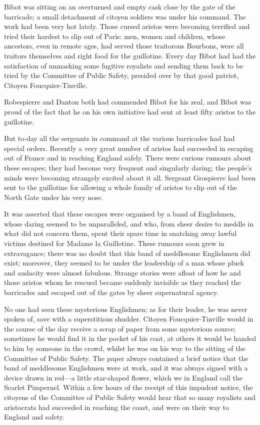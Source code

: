 Bibot was sitting on an overturned and empty cask close by the gate of the barricade; a small detachment of citoyen soldiers was under his command. The work had been very hot lately. Those cursed aristos were becoming terrified and tried their hardest to slip out of Paris: men, women and children, whose ancestors, even in remote ages, had served those traitorous Bourbons, were all traitors themselves and right food for the guillotine. Every day Bibot had had the satisfaction of unmasking some fugitive royalists and sending them back to be tried by the Committee of Public Safety, presided over by that good patriot, Citoyen Foucquier-Tinville.

Robespierre and Danton both had commended Bibot for his zeal, and Bibot was proud of the fact that he on his own initiative had sent at least fifty aristos to the guillotine.

But to-day all the sergeants in command at the various barricades had had special orders. Recently a very great number of aristos had succeeded in escaping out of France and in reaching England safely. There were curious rumours about these escapes; they had become very frequent and singularly daring; the people's minds were becoming strangely excited about it all. Sergeant Grospierre had been sent to the guillotine for allowing a whole family of aristos to slip out of the North Gate under his very nose.

It was asserted that these escapes were organised by a band of Englishmen, whose daring seemed to be unparalleled, and who, from sheer desire to meddle in what did not concern them, spent their spare time in snatching away lawful victims destined for Madame la Guillotine. These rumours soon grew in extravagance; there was no doubt that this band of meddlesome Englishmen did exist; moreover, they seemed to be under the leadership of a man whose pluck and audacity were almost fabulous. Strange stories were afloat of how he and those aristos whom he rescued became suddenly invisible as they reached the barricades and escaped out of the gates by sheer supernatural agency.

No one had seen these mysterious Englishmen; as for their leader, he was never spoken of, save with a superstitious shudder. Citoyen Foucquier-Tinville would in the course of the day receive a scrap of paper from some mysterious source; sometimes he would find it in the pocket of his coat, at others it would be handed to him by someone in the crowd, whilst he was on his way to the sitting of the Committee of Public Safety. The paper always contained a brief notice that the band of meddlesome Englishmen were at work, and it was always signed with a device drawn in red—a little star-shaped flower, which we in England call the Scarlet Pimpernel. Within a few hours of the receipt of this impudent notice, the citoyens of the Committee of Public Safety would hear that so many royalists and aristocrats had succeeded in reaching the coast, and were on their way to England and safety.

